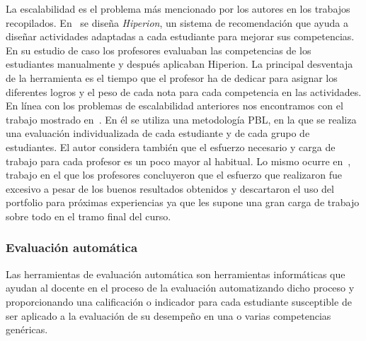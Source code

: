 La escalabilidad es el problema más mencionado por los autores en los trabajos recopilados. En~\cite{serrano2013hiperion} se diseña \emph{Hiperion}, un sistema de recomendación que ayuda a diseñar actividades adaptadas a cada estudiante para mejorar sus competencias. En su estudio de caso los profesores evaluaban las competencias de los estudiantes manualmente y después aplicaban Hiperion. La principal desventaja de la herramienta es el tiempo que el profesor ha de dedicar para asignar los diferentes logros y el peso de cada nota para cada competencia en las actividades. En línea con los problemas de escalabilidad anteriores nos encontramos con el trabajo mostrado en~\cite{lacuesta2009active}. En él se utiliza una metodología PBL, en la que se realiza una evaluación individualizada de cada estudiante y de cada grupo de estudiantes. El autor considera también que el esfuerzo necesario y carga de trabajo para cada profesor es un poco mayor al habitual. Lo mismo ocurre en~\cite{benlloch2007adapting}, trabajo en el que los profesores concluyeron que el esfuerzo que realizaron fue excesivo a pesar de los buenos resultados obtenidos y descartaron el uso del portfolio para próximas experiencias ya que les supone una gran carga de trabajo sobre todo en el tramo final del curso.

\subsubsection{Evaluación automática}

Las herramientas de evaluación automática son herramientas informáticas que ayudan al docente en el proceso de la evaluación automatizando dicho proceso y proporcionando una calificación o indicador para cada estudiante susceptible de ser aplicado a la evaluación de su desempeño en una o varias competencias genéricas. %

